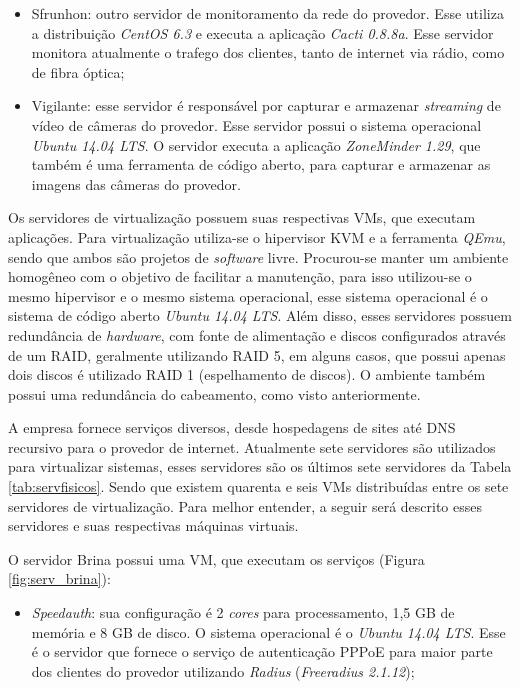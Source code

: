\begin{itemize}
 \item Sfrunhon: outro servidor de monitoramento da rede do provedor. Esse utiliza a distribuição \textit{CentOS 6.3} e executa a aplicação
 \textit{Cacti 0.8.8a}. Esse servidor monitora atualmente o trafego dos clientes, tanto de internet via rádio, como de fibra óptica;
 
 \item Vigilante: esse servidor é responsável por capturar e armazenar \textit{streaming} de vídeo de câmeras do provedor. Esse servidor possui
 o sistema operacional \textit{Ubuntu 14.04 \ac{LTS}}. O servidor executa a aplicação \textit{ZoneMinder 1.29}, que também é uma ferramenta de 
 código aberto, para capturar e armazenar as imagens das câmeras do provedor.
\end{itemize}


Os servidores de virtualização possuem suas respectivas \ac{VM}s, que executam aplicações. Para virtualização utiliza-se o hipervisor 
\ac{KVM} e a ferramenta \textit{QEmu}, sendo que ambos são projetos de \textit{software} livre. Procurou-se manter um ambiente homogêneo 
com o objetivo de facilitar a manutenção, para isso utilizou-se o mesmo hipervisor e o mesmo sistema operacional, esse sistema operacional é
o sistema de código aberto \textit{Ubuntu 14.04 \ac{LTS}}.
Além disso, esses servidores possuem redundância de \textit{hardware}, com fonte de alimentação e discos configurados através de um \ac{RAID}, 
geralmente utilizando \ac{RAID} 5, em alguns casos, que possui apenas dois discos é utilizado \ac{RAID} 1 (espelhamento de discos). O ambiente 
também possui uma redundância do cabeamento, como visto anteriormente.

A empresa fornece serviços diversos, desde hospedagens de sites até \ac{DNS} recursivo para o provedor de internet. Atualmente sete servidores 
são utilizados para virtualizar sistemas, esses servidores são os últimos sete servidores da Tabela \ref{tab:servfisicos}.
Sendo que existem quarenta e seis \ac{VM}s distribuídas entre os sete servidores de virtualização.
Para melhor entender, a seguir será descrito esses servidores e suas respectivas máquinas virtuais.

O servidor Brina possui uma \ac{VM}, que executam os serviços (Figura \ref{fig:serv_brina}):
\begin{itemize}
 \item \textit{Speedauth}: sua configuração é 2 \textit{cores} para processamento, 1,5 GB de memória e 8 GB de disco. O sistema operacional é o 
 \textit{Ubuntu 14.04 \ac{LTS}}. Esse é o servidor que fornece o serviço de autenticação \ac{PPPoE} para maior parte dos clientes do provedor 
 utilizando \textit{Radius} (\textit{Freeradius 2.1.12});
\end{itemize}

